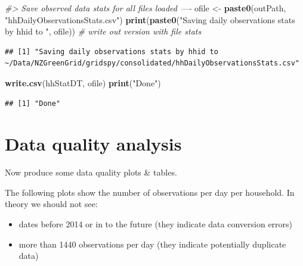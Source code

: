 \documentclass[]{article}
\newenvironment{Shaded}{\begin{snugshade}}{\end{snugshade}}
\newcommand{\KeywordTok}[1]{\textcolor[rgb]{0.13,0.29,0.53}{\textbf{#1}}}
\newcommand{\StringTok}[1]{\textcolor[rgb]{0.31,0.60,0.02}{#1}}
\newcommand{\CommentTok}[1]{\textcolor[rgb]{0.56,0.35,0.01}{\textit{#1}}}
\newcommand{\NormalTok}[1]{#1}
\providecommand{\tightlist}{%
  \setlength{\itemsep}{0pt}\setlength{\parskip}{0pt}}
\begin{document}
\begin{Shaded}
\begin{Highlighting}[]
\CommentTok{#> Save observed data stats for all files loaded ----}
\NormalTok{ofile <-}\StringTok{ }\KeywordTok{paste0}\NormalTok{(outPath, }\StringTok{"hhDailyObservationsStats.csv"}\NormalTok{)}
\KeywordTok{print}\NormalTok{(}\KeywordTok{paste0}\NormalTok{(}\StringTok{"Saving daily observations stats by hhid to "}\NormalTok{, ofile)) }\CommentTok{# write out version with file stats}
\end{Highlighting}
\end{Shaded}

\begin{verbatim}
## [1] "Saving daily observations stats by hhid to ~/Data/NZGreenGrid/gridspy/consolidated/hhDailyObservationsStats.csv"
\end{verbatim}

\begin{Shaded}
\begin{Highlighting}[]
\KeywordTok{write.csv}\NormalTok{(hhStatDT, ofile)}
\KeywordTok{print}\NormalTok{(}\StringTok{"Done"}\NormalTok{)}
\end{Highlighting}
\end{Shaded}

\begin{verbatim}
## [1] "Done"
\end{verbatim}

\section{Data quality analysis}\label{data-quality-analysis}

Now produce some data quality plots \& tables.

The following plots show the number of observations per day per
household. In theory we should not see:

\begin{itemize}
\tightlist
\item
  dates before 2014 or in to the future (they indicate data conversion
  errors)
\item
  more than 1440 observations per day (they indicate potentially
  duplicate data)
\end{itemize}
\end{document}
